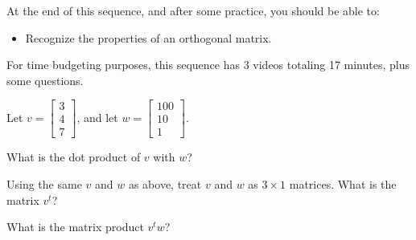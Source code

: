 







At the end of this sequence, and after some practice, you should be able to:

\begin{itemize}
\item Recognize the properties of an orthogonal matrix. 
\end{itemize}


For time budgeting purposes, this sequence has 3 videos totaling 17 minutes, 
plus some questions.  




\endedxtext

\endedxvertical






Let $v = \left[ \begin{array}{c} 3 \\ 4 \\ 7 \end{array} \right]$, and let $w  = \left[ \begin{array}{cc} 100  \\ 10  \\ 1  \end{array} \right]$.  


What is the dot product of $v$ with $w$?  




\endedxproblem



Using the same $v$ and $w$ as above,  treat $v$ and $w$ as  $3\times 1$ matrices.  What is the matrix $v^t$?   






What is the matrix product $v^t w$?  






